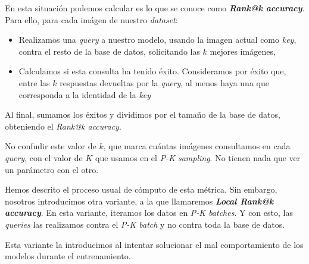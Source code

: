 En esta situación podemos calcular es lo que se conoce como \textbf{\textit{Rank@k accuracy}}. Para ello, para cada imágen de nuestro \textit{dataset}:

\begin{itemize}
    \item Realizamos una \textit{query} a nuestro modelo, usando la imagen actual como \textit{key}, contra el resto de la base de datos, solicitando las $k$ mejores imágenes,
    \item Calculamos si esta consulta ha tenido éxito. Consideramos por éxito que, entre las $k$ respuestas devueltas por la \textit{query}, al menos haya una que corresponda a la identidad de la \textit{key}
\end{itemize}

Al final, sumamos los éxitos y dividimos por el tamaño de la base de datos, obteniendo el \textit{Rank@k accuracy}.

\begin{observacion}

    No confudir este valor de $k$, que marca cuántas imágenes consultamos en cada \textit{query}, con el valor de $K$ que usamos en el \textit{P-K sampling}. No tienen nada que ver un parámetro con el otro.

\end{observacion}

\begin{observacion}

    Hemos descrito el proceso usual de cómputo de esta métrica. Sin embargo, nosotros introducimos otra variante, a la que llamaremos \textbf{\textit{Local Rank@k accuracy}}. En esta variante, iteramos los datos en \textit{P-K batches}. Y con esto, las \textit{queries} las realizamos contra el \textit{P-K batch} y no contra toda la base de datos.

    Esta variante la introducimos al intentar solucionar el mal comportamiento de los modelos durante el entrenamiento.

\end{observacion}
